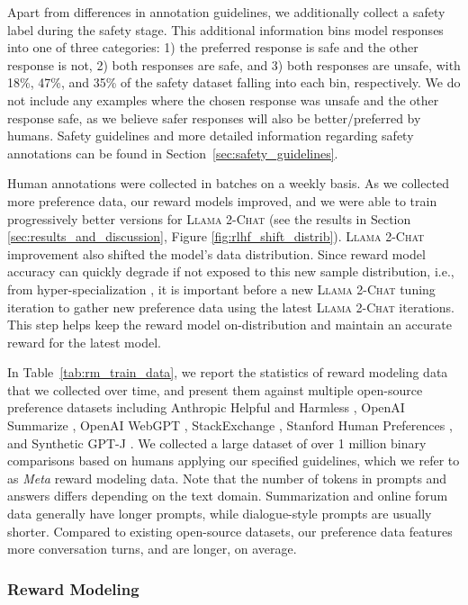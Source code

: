 Apart from differences in annotation guidelines, we additionally collect a safety label during the safety stage. This additional information bins model responses into one of three categories: 1) the preferred response is safe and the other response is not, 2) both responses are safe, and 3) both responses are unsafe, with 18\%, 47\%, and 35\% of the safety dataset falling into each bin, respectively. We do not include any examples where the chosen response was unsafe and the other response safe, as we believe safer responses will also be better/preferred by humans. Safety guidelines and more detailed information regarding safety annotations can be found in Section~\ref{sec:safety_guidelines}.

Human annotations were collected in batches on a weekly basis. As we collected more preference data, our reward models improved, and we were able to train progressively better versions for \textsc{Llama 2-Chat} (see the results in Section \ref{sec:results_and_discussion}, Figure \ref{fig:rlhf_shift_distrib}). 
\textsc{Llama 2-Chat} improvement also shifted the model's data distribution. Since reward model accuracy can quickly degrade if not exposed to this new sample distribution, i.e., from hyper-specialization \citep{scialom2020coldgans}, it is important before a new \textsc{Llama 2-Chat} tuning iteration to gather new preference data using the latest \textsc{Llama 2-Chat} iterations. This step helps keep the reward model on-distribution and maintain an accurate reward for the latest model.

In Table~\ref{tab:rm_train_data}, we report the statistics of reward modeling data that we collected over time, and present them against multiple open-source preference datasets including Anthropic Helpful and Harmless \citep{bai2022training}, OpenAI Summarize \citep{stienon2020learning}, OpenAI WebGPT \citep{nakano2021webgpt}, StackExchange \citep{h4stackexchange}, Stanford Human Preferences \citep{SHP}, and Synthetic GPT-J \citep{synthetic_gptj}. We collected a large dataset of over 1 million binary comparisons based on humans applying our specified guidelines, which we refer to as \emph{Meta} reward modeling data. Note that the number of tokens in prompts and answers differs depending on the text domain. Summarization and online forum data generally have longer prompts, while dialogue-style prompts are usually shorter. Compared to existing open-source datasets, our preference data features more conversation turns, and are longer, on average.

\subsubsection{Reward Modeling}
\label{subsec:reward_modeling}

